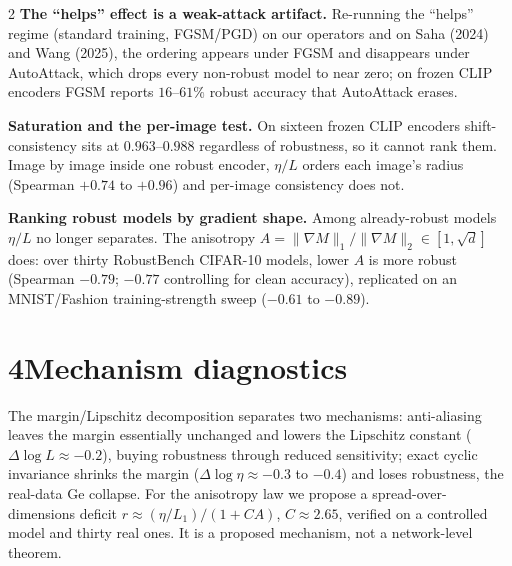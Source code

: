 \documentclass[10pt]{article}
\newcommand{\etaL}{\ensuremath{\eta/L}}
\begin{document}
\begin{multicols}{2}
\textbf{The ``helps'' effect is a weak-attack artifact.} Re-running the ``helps'' regime (standard training, FGSM/PGD) on our operators and on Saha (2024) and Wang (2025), the ordering appears under FGSM and disappears under AutoAttack, which drops every non-robust model to near zero; on frozen CLIP encoders FGSM reports $16$--$61\%$ robust accuracy that AutoAttack erases.

\textbf{Saturation and the per-image test.} On sixteen frozen CLIP encoders shift-consistency sits at $0.963$--$0.988$ regardless of robustness, so it cannot rank them. Image by image inside one robust encoder, \etaL{} orders each image's radius (Spearman $+0.74$ to $+0.96$) and per-image consistency does not.

\textbf{Ranking robust models by gradient shape.} Among already-robust models \etaL{} no longer separates. The anisotropy $A=\lVert\nabla M\rVert_1/\lVert\nabla M\rVert_2\in[1,\sqrt d]$ does: over thirty RobustBench CIFAR-10 models, lower $A$ is more robust (Spearman $-0.79$; $-0.77$ controlling for clean accuracy), replicated on an MNIST/Fashion training-strength sweep ($-0.61$ to $-0.89$).

\section*{4\quad Mechanism diagnostics}
The margin/Lipschitz decomposition separates two mechanisms: anti-aliasing leaves the margin essentially unchanged and lowers the Lipschitz constant ($\Delta\log L\approx-0.2$), buying robustness through reduced sensitivity; exact cyclic invariance shrinks the margin ($\Delta\log\eta\approx-0.3$ to $-0.4$) and loses robustness, the real-data Ge collapse. For the anisotropy law we propose a spread-over-dimensions deficit $r\approx(\eta/L_1)/(1+CA)$, $C\approx2.65$, verified on a controlled model and thirty real ones. It is a proposed mechanism, not a network-level theorem.


\end{multicols}
\end{document}
